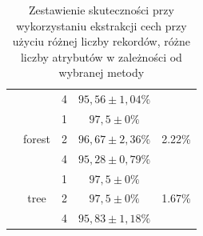 \begin{table}[]
\begin{tabular}{|c|c|c|c|c|}
                      &                         & 4                & $ 95,56 \pm 1,04 \% $  & \\ \cline{2-5} 
                      & \multirow{3}{*}{forest} & 1                & $ 97,5 \pm 0 \% $       & \multirow{3}{*}{2.22\%} \\ \cline{3-4} 
                      &                         & 2                & $ 96,67 \pm 2,36 \% $   &\\ \cline{3-4} 
                      &                         & 4                & $ 95,28 \pm 0,79 \% $  & \\ \cline{2-5} 
                      & \multirow{3}{*}{tree}   & 1                & $ 97,5 \pm 0 \% $       & \multirow{3}{*}{1.67\%} \\ \cline{3-4} 
                      &                         & 2                & $ 97,5 \pm 0 \% $       &\\ \cline{3-4} 
                      &                         & 4                & $ 95,83 \pm 1,18 \% $   &\\ \hline
\end{tabular}
\caption{Zestawienie skuteczności przy wykorzystaniu ekstrakcji cech przy użyciu różnej liczby rekordów, różne liczby atrybutów w zależności od wybranej metody}
\label{table:fxTable}

\end{table}



